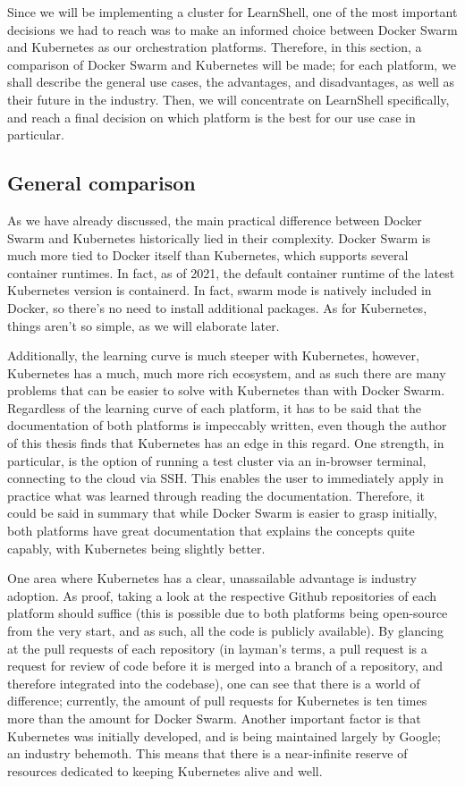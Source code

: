 \documentclass[thesis=B,english]{FITthesis}[2019/12/23]
\begin{document}
Since we will be implementing a cluster for LearnShell, one of the most important decisions we had to reach was to make an informed choice between Docker Swarm and Kubernetes as our orchestration platforms. Therefore, in this section, a comparison of Docker Swarm and Kubernetes will be made; for each platform, we shall describe the general use cases, the advantages, and disadvantages, as well as their future in the industry. Then, we will concentrate on LearnShell specifically, and reach a final decision on which platform is the best for our use case in particular.

\subsection{General comparison}

As we have already discussed, the main practical difference between Docker Swarm and Kubernetes historically lied in their complexity. Docker Swarm is much more tied to Docker itself than Kubernetes, which supports several container runtimes. In fact, as of 2021, the default container runtime of the latest Kubernetes version is containerd. \cite{kube-containerd} In fact, swarm mode is natively included in Docker, so there's no need to install additional packages. As for Kubernetes, things aren't so simple, as we will elaborate later. 

Additionally, the learning curve is much steeper with Kubernetes, however, Kubernetes has a much, much more rich ecosystem, and as such there are many problems that can be easier to solve with Kubernetes than with Docker Swarm. Regardless of the learning curve of each platform, it has to be said that the documentation of both platforms is impeccably written, even though the author of this thesis finds that Kubernetes has an edge in this regard. One strength, in particular, is the option of running a test cluster via an in-browser terminal, connecting to the cloud via SSH. This enables the user to immediately apply in practice what was learned through reading the documentation. Therefore, it could be said in summary that while Docker Swarm is easier to grasp initially, both platforms have great documentation that explains the concepts quite capably, with Kubernetes being slightly better.

One area where Kubernetes has a clear, unassailable advantage is industry adoption. As proof, taking a look at the respective Github repositories of each platform should suffice (this is possible due to both platforms being open-source from the very start, and as such, all the code is publicly available). By glancing at the pull requests of each repository (in layman's terms, a pull request is a request for review of code before it is merged into a branch of a repository, and therefore integrated into the codebase), one can see that there is a world of difference; currently, the amount of pull requests for Kubernetes is ten times more than the amount for Docker Swarm. \cite{swarm-pull, kube-pull} Another important factor is that Kubernetes was initially developed, and is being maintained largely by Google; an industry behemoth. This means that there is a near-infinite reserve of resources dedicated to keeping Kubernetes alive and well.
\end{document}
